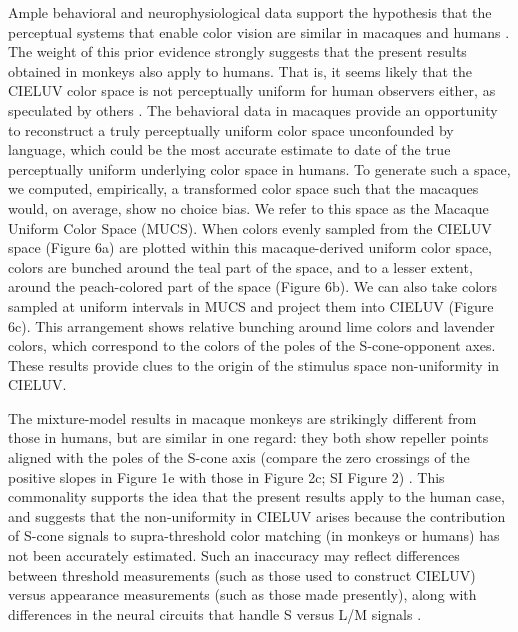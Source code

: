 Ample behavioral and neurophysiological data support the hypothesis that the perceptual systems that enable color vision are similar in macaques and humans \citep{schnapf_spectral_1987,gagin_color-detection_2014,horwitz_what_2015,lafer-sousa_color-biased_2016}. The weight of this prior evidence strongly suggests that the present results obtained in monkeys also apply to humans. That is, it seems likely that the CIELUV color space is not perceptually uniform for human observers either, as speculated by others \citep{stockman_colorimetry_2010,judd_ideal_1969}. The behavioral data in macaques provide an opportunity to reconstruct a truly perceptually uniform color space unconfounded by language, which could be the most accurate estimate to date of the true perceptually uniform underlying color space in humans. To generate such a space, we computed, empirically, a transformed color space such that the macaques would, on average, show no choice bias. We refer to this space as the Macaque Uniform Color Space (MUCS). When colors evenly sampled from the CIELUV space (Figure 6a) are plotted within this macaque-derived uniform color space, colors are bunched around the teal part of the space, and to a lesser extent, around the peach-colored part of the space (Figure 6b). We can also take colors sampled at uniform intervals in MUCS and project them into CIELUV (Figure 6c). This arrangement shows relative bunching around lime colors and lavender colors, which correspond to the colors of the poles of the S-cone-opponent axes. These results provide clues to the origin of the stimulus space non-uniformity in CIELUV.

The mixture-model results in macaque monkeys are strikingly different from those in humans, but are similar in one regard: they both show repeller points aligned with the poles of the S-cone axis (compare the zero crossings of the positive slopes in Figure 1e with those in Figure 2c; SI Figure 2) \citep{skelton_biological_2017,bae_why_2015,panichello_error-correcting_2019}. This commonality supports the idea that the present results apply to the human case, and suggests that the non-uniformity in CIELUV arises because the contribution of S-cone signals to supra-threshold color matching (in monkeys or humans) has not been accurately estimated. Such an inaccuracy may reflect differences between threshold measurements (such as those used to construct CIELUV) versus appearance measurements (such as those made presently), along with differences in the neural circuits that handle S versus L/M signals \citep{RN655, conway_color_2014}. 

